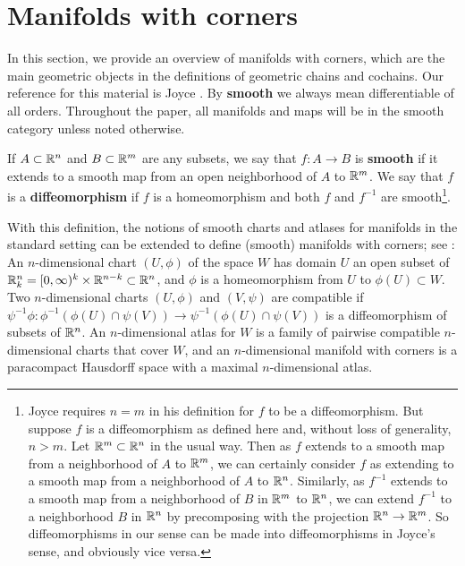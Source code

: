 
\section{Manifolds with corners}\label{S: manifolds with corners}

In this section, we provide an overview of manifolds with corners, which are the main geometric objects in the definitions of geometric chains and cochains.
Our reference for this material is Joyce \cite{Joy12}.
By \textbf{smooth} we always mean differentiable of all orders.
Throughout the paper, all manifolds and maps will be in the smooth category unless noted otherwise.

\begin{definition}
	If $A \subset \mathbb{R}^n$ and $B \subset \mathbb{R}^m$ are any subsets, we say that $f \colon A \to B$ is \textbf{smooth} if it extends to a smooth map from an open neighborhood of $A$ to $\mathbb{R}^m$.
	We say that $f$ is a \textbf{diffeomorphism} if $f$ is a homeomorphism and both $f$ and $f^{-1}$ are smooth\footnote{Joyce requires $n = m$ in his definition for $f$ to be a diffeomorphism.
	But suppose $f$ is a diffeomorphism as defined here and, without loss of generality, $n>m$.
	Let $\mathbb{R}^m \subset \mathbb{R}^n$ in the usual way.
	Then as $f$ extends to a smooth map from a neighborhood of $A$ to $\mathbb{R}^m$, we can certainly consider $f$ as extending to a smooth map from a neighborhood of $A$ to $\mathbb{R}^n$.
	Similarly, as $f^{-1}$ extends to a smooth map from a neighborhood of $B$ in $\mathbb{R}^m$ to $\mathbb{R}^n$, we can extend $f^{-1}$ to a neighborhood $B$ in $\mathbb{R}^n$ by precomposing with the projection $\mathbb{R}^n \to \mathbb{R}^m$.
	So diffeomorphisms in our sense can be made into diffeomorphisms in Joyce's sense, and obviously vice versa.}.
\end{definition}

With this definition, the notions of smooth charts and atlases for manifolds in the standard setting can be extended to define (smooth) manifolds with corners; see \cite[Section 2]{Joy12}: An $n$-dimensional chart $(U,\phi)$ of the space $W$ has domain $U$ an open subset of $\mathbb{R}^n_k = [0,\infty)^k \times \mathbb{R}^{n-k} \subset \mathbb{R}^n$, and $\phi$ is a homeomorphism from $U$ to $\phi(U) \subset W$.
Two $n$-dimensional charts $(U,\phi)$ and $(V,\psi)$ are compatible if $\psi^{-1}\phi \colon \phi^{-1}(\phi(U) \cap \psi(V)) \to \psi^{-1}(\phi(U) \cap \psi(V))$ is a diffeomorphism of subsets of $\mathbb{R}^n$.
An $n$-dimensional atlas for $W$ is a family of pairwise compatible $n$-dimensional charts that cover $W$, and an $n$-dimensional manifold with corners is a paracompact Hausdorff space with a maximal $n$-dimensional atlas.

